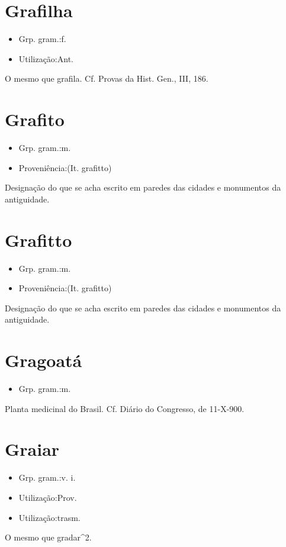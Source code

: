 \section{Grafilha}
\begin{itemize}
\item {Grp. gram.:f.}
\end{itemize}
\begin{itemize}
\item {Utilização:Ant.}
\end{itemize}
O mesmo que \textunderscore grafila\textunderscore . Cf. \textunderscore Provas da Hist. Gen.\textunderscore , III, 186.
\section{Grafito}
\begin{itemize}
\item {Grp. gram.:m.}
\end{itemize}
\begin{itemize}
\item {Proveniência:(It. \textunderscore grafitto\textunderscore )}
\end{itemize}
Designação do que se acha escrito em paredes das cidades e monumentos da antiguidade.
\section{Grafitto}
\begin{itemize}
\item {Grp. gram.:m.}
\end{itemize}
\begin{itemize}
\item {Proveniência:(It. \textunderscore grafitto\textunderscore )}
\end{itemize}
Designação do que se acha escrito em paredes das cidades e monumentos da antiguidade.
\section{Gragoatá}
\begin{itemize}
\item {Grp. gram.:m.}
\end{itemize}
Planta medicinal do Brasil. Cf. \textunderscore Diário do Congresso\textunderscore , de 11-X-900.
\section{Graiar}
\begin{itemize}
\item {Grp. gram.:v. i.}
\end{itemize}
\begin{itemize}
\item {Utilização:Prov.}
\end{itemize}
\begin{itemize}
\item {Utilização:trasm.}
\end{itemize}
O mesmo que \textunderscore gradar\textunderscore ^2.
